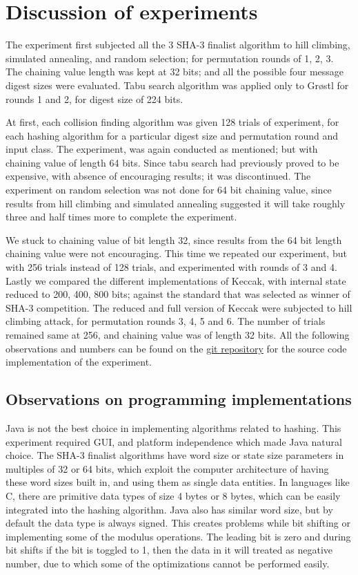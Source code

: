 \chapter{Discussion of experiments}

The experiment first subjected all the 3 SHA-3 finalist algorithm to hill climbing, simulated annealing, and
random selection; for permutation rounds of 1, 2, 3. The chaining value length was kept at 32 bits; and all
the possible four message digest sizes were evaluated. Tabu search algorithm was applied only to Gr{\o}stl
for rounds 1 and 2, for digest size of 224 bits. 

At first, each collision finding algorithm was given 128 trials of experiment, for each hashing algorithm for
a particular digest size and permutation round and input class. The experiment, was again conducted as mentioned;
but with chaining value of length 64 bits. Since tabu search had previously proved to be expensive, with absence 
of encouraging results; it was discontinued. The experiment on random selection was not done for 64 bit chaining
value, since results from hill climbing and simulated annealing suggested it will take roughly three and half times
more to complete the experiment. 

We stuck to chaining value of bit length 32, since results from the 64 bit length chaining value were not encouraging.
This time we repeated our experiment, but with 256 trials instead of 128 trials, and 
experimented with rounds of 3 and 4. Lastly we compared the different implementations of Keccak, with internal
state reduced to 200, 400, 800 bits; against the standard that was selected as winner of SHA-3 competition. 
The reduced and full version of Keccak were subjected to hill climbing attack, for permutation rounds 3, 4, 5 and 
6. The number of trials remained same at 256, and chaining value was of length 32 bits. All the following 
observations and numbers can be found on the 
\href{https://github.com/sxs9174/MSProjectCode/tree/master/MSProjectCode/Output}{git repository} for the source
code implementation of the experiment.

\section{Observations on programming implementations}

Java is not the best choice in implementing algorithms related to hashing. This experiment required GUI, and
platform independence which made Java natural choice. The SHA-3 finalist algorithms have word size or state size 
parameters in multiples of 32 or 64 bits, which exploit the computer architecture of having these word sizes
built in, and using them as single data entities. In languages like C, there are primitive data types
of size 4 bytes or 8 bytes, which can be easily integrated into the hashing algorithm. Java also has similar
word size, but by default the data type is always signed. This creates problems while bit shifting or implementing
some of the modulus operations. The leading bit is zero and during bit shifts if the bit is toggled to 1, then 
the data in it will treated as negative number, due to which some of the optimizations cannot be performed easily.

